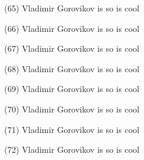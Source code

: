 \documentclass{article}%
\begin{document}
\begin{minipage}{0.3333333333333333\textwidth}%
(65) Vladimir Gorovikov%
\newline%
%
is so%
\newline%
%
is cool%
\newline%
%
\end{minipage}%
\begin{minipage}{0.3333333333333333\textwidth}%
(66) Vladimir Gorovikov%
\newline%
%
is so%
\newline%
%
is cool%
\newline%
%
\end{minipage}%
\newline%
\begin{minipage}{0.3333333333333333\textwidth}%
(67) Vladimir Gorovikov%
\newline%
%
is so%
\newline%
%
is cool%
\newline%
%
\end{minipage}%
\begin{minipage}{0.3333333333333333\textwidth}%
(68) Vladimir Gorovikov%
\newline%
%
is so%
\newline%
%
is cool%
\newline%
%
\end{minipage}%
\begin{minipage}{0.3333333333333333\textwidth}%
(69) Vladimir Gorovikov%
\newline%
%
is so%
\newline%
%
is cool%
\newline%
%
\end{minipage}%
\newline%
\begin{minipage}{0.3333333333333333\textwidth}%
(70) Vladimir Gorovikov%
\newline%
%
is so%
\newline%
%
is cool%
\newline%
%
\end{minipage}%
\begin{minipage}{0.3333333333333333\textwidth}%
(71) Vladimir Gorovikov%
\newline%
%
is so%
\newline%
%
is cool%
\newline%
%
\end{minipage}%
\begin{minipage}{0.3333333333333333\textwidth}%
(72) Vladimir Gorovikov%
\newline%
%
is so%
\newline%
%
is cool%
\newline%
%
\end{minipage}%
\end{document}
